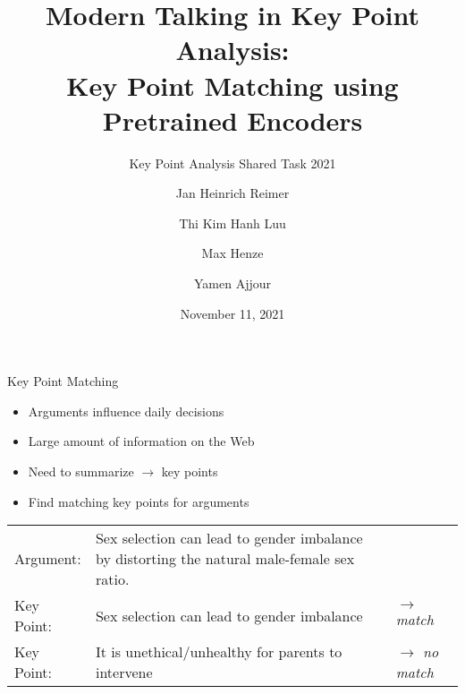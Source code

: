 \documentclass[english,handout]{mlutalk}
\title{%
  Modern Talking in Key Point Analysis: \\
  Key Point Matching using Pretrained Encoders%
}
\subtitle{Key Point Analysis Shared Task 2021}
\author{\texorpdfstring{\smaller}{}Jan Heinrich Reimer \and Thi Kim Hanh Luu \and Max Henze \and Yamen Ajjour}
\institute{Martin Luther University Halle-Wittenberg, Germany}
\date{November 11, 2021}
\begin{document}
\titleframe

\begin{frame}{Key Point Matching}
  \begin{itemize}
    \item Arguments influence daily decisions~\cite{Bar-HaimEFKLS2020}
    \item Large amount of information on the Web
    \item Need to summarize \(\to\) key points
    \item Find matching key points for arguments
  \end{itemize}
  \begin{example}
    \smaller\renewcommand{\arraystretch}{1.15}
    \begin{tabularx}{0.855\linewidth}{@{}lXl@{}}
      Argument: & Sex selection can lead to gender imbalance by distorting the natural male-female sex ratio. \\
      Key Point: & Sex selection can lead to gender imbalance & \textcolor{Green4}{\(\to\) \emph{match}} \\
      Key Point: & It is unethical/unhealthy for parents to intervene & \textcolor{OrangeRed2}{\(\to\) \emph{no match}}
    \end{tabularx}
  \end{example}
\end{frame}
\end{document}

